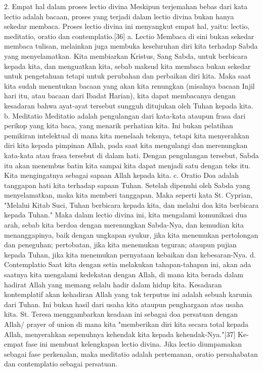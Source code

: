 2. Empat hal dalam proses lectio divina
Meskipun terjemahan bebas dari kata lectio adalah bacaan, proses yang terjadi dalam lectio divina bukan hanya sekedar membaca. Proses lectio divina ini menyangkut empat hal, yaitu: lectio, meditatio, oratio dan contemplatio.[36]
a. Lectio
Membaca di sini bukan sekedar membaca tulisan, melainkan juga membuka keseluruhan diri kita terhadap Sabda yang menyelamatkan. Kita membiarkan Kristus, Sang Sabda, untuk berbicara kepada kita, dan menguatkan kita, sebab maksud kita membaca bukan sekedar untuk pengetahuan tetapi untuk perubahan dan perbaikan diri kita. Maka saat kita sudah menentukan bacaan yang akan kita renungkan (misalnya bacaan Injil hari itu, atau bacaan dari Ibadat Harian), kita dapat membacanya dengan kesadaran bahwa ayat-ayat tersebut sungguh ditujukan oleh Tuhan kepada kita.
b. Meditatio
Meditatio adalah pengulangan dari kata-kata ataupun frasa dari perikop yang kita baca, yang menarik perhatian kita. Ini bukan pelatihan pemikiran intelektual di mana kita menelaah teksnya, tetapi kita menyerahkan diri kita kepada pimpinan Allah, pada saat kita mengulangi dan merenungkan kata-kata atau frasa tersebut di dalam hati. Dengan pengulangan tersebut, Sabda itu akan menembus batin kita sampai kita dapat menjadi satu dengan teks itu. Kita mengingatnya sebagai sapaan Allah kepada kita.
c. Oratio
Doa adalah tanggapan hati kita terhadap sapaan Tuhan. Setelah dipenuhi oleh Sabda yang menyelamatkan, maka kita memberi tanggapan. Maka seperti kata St. Cyprian, "Melalui Kitab Suci, Tuhan berbicara kepada kita, dan melalui doa kita berbicara kepada Tuhan." Maka dalam lectio divina ini, kita mengalami komunikasi dua arah, sebab kita berdoa dengan merenungkan Sabda-Nya, dan kemudian kita menanggapinya, baik dengan ungkapan syukur, jika kita menemukan pertolongan dan peneguhan; pertobatan, jika kita menemukan teguran; ataupun pujian kepada Tuhan, jika kita menemukan pernyataan kebaikan dan kebesaran-Nya.
d. Contemplatio
Saat kita dengan setia melakukan tahapan-tahapan ini, akan ada saatnya kita mengalami kedekatan dengan Allah, di mana kita berada dalam hadirat Allah yang memang selalu hadir dalam hidup kita. Kesadaran kontemplatif akan kehadiran Allah yang tak terputus ini adalah sebuah karunia dari Tuhan. Ini bukan hasil dari usaha kita ataupun penghargaan atas usaha kita. St. Teresa menggambarkan keadaan ini sebagai  doa persatuan dengan Allah/ prayer of union di mana kita "memberikan diri kita secara total kepada Allah, menyerahkan sepenuhnya kehendak kita kepada kehendak-Nya."[37]
Ke-empat fase ini membuat kelengkapan lectio divina. Jika lectio diumpamakan sebagai fase perkenalan, maka meditatio adalah pertemanan, oratio persahabatan dan contemplatio sebagai persatuan.
